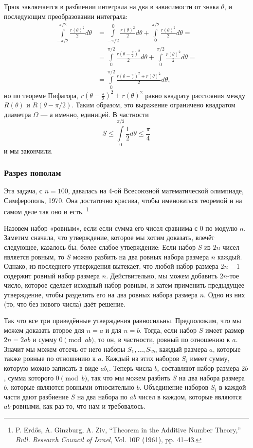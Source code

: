Трюк заключается в разбиении интеграла на два в зависимости от знака $\theta$, и последующим преобразовании интеграла:
\begin{align*}
\int\limits_{-\pi/2}^{\pi/2}\frac{r(\theta)^2}{2}d\theta&=\int\limits_{-\pi/2}^{0}\frac{r(\theta)^2}{2}d\theta+\int\limits_{0}^{\pi/2}\frac{r(\theta)^2}{2}d\theta=
\\
&=\int\limits_{0}^{\pi/2}\frac{r(\theta-\tfrac\pi2)^2}{2}d\theta+\int\limits_{0}^{\pi/2}\frac{r(\theta)^2}{2}d\theta=
\\
&=\int\limits_{0}^{\pi/2}\frac{r(\theta-\tfrac\pi2)^2+r(\theta)^2}{2}d\theta,
\end{align*}
но по теореме Пифагора, $r(\theta-\tfrac\pi2)^2+r(\theta)^2$ равно квадрату расстояния между $R(\theta)$ и $R(\theta- \pi/2)$.
Таким образом, это выражение ограничено квадратом диаметра $\Omega$ --- а именно, единицей.
В частности
\[S\le \int\limits_{0}^{\pi/2}\frac12d\theta\le\frac\pi4\]
и мы закончили.
\heart

\subsubsection*{Разрез пополам}

Эта задача, с $n=100$, давалась на 4-ой Всесоюзной математической олимпиаде, Симферополь, 1970.
Она достаточно красива, чтобы именоваться теоремой и на самом деле так оно и есть.%
\footnote{P. Erd\H{o}s, A. Ginzburg, A. Ziv, ``Theorem in the Additive Number Theory,'' \emph{Bull. Research Council of Israel}, Vol. 10F (1961), pp. 41--43.}

Назовем набор «ровным», если если сумма его чисел сравнима с $0$ по модулю $n$.
Заметим сначала, что утверждение, которое мы хотим доказать, влечёт следующее, казалось бы, более слабое утверждение: 
Если набор $S$ из $2n$ чисел является ровным, то $S$ можно разбить на два ровных набора размера $n$ каждый.
Однако, из последнего утверждения вытекает, что любой набор размера $2n-1$ содержит ровный набор размера $n$.
Действительно, мы можем добавить $2n$-тое число, которое сделает исходный набор ровным, и затем применить предыдущее утверждение, чтобы разделить его на два ровных набора размера $n$. 
Одно из них (то, что без нового числа) даёт решение.

Так что все три приведённые утверждения равносильны.
Предположим, что мы можем доказать второе для $n = a$ и для $n = b$.
Тогда, если набор $S$ имеет размер $2n = 2ab$ и сумму $0 \pmod {ab}$, то он, в частности, ровный по отношению к $a$. 
Значит мы можем отсечь от него наборы $S_1,\dots,S_{2b}$, каждый размера $a$, которые также ровные по отношению к $a$.
Каждый из этих наборов $S_i$ имеет сумму, которую можно записать в виде $ab_i$.
Теперь числа $b_i$ составляют набор размера $2b$, сумма которого $0 \pmod b$, так что мы можем разбить $S$ на два набора размера $b$, которые являются ровными относительно $b$.
Объединение наборов $S_i$ в каждой части дают разбиение $S$ на два набора по $ab$ чисел в каждом, которые являются $ab$-ровными, как раз то, что нам и требовалось.

